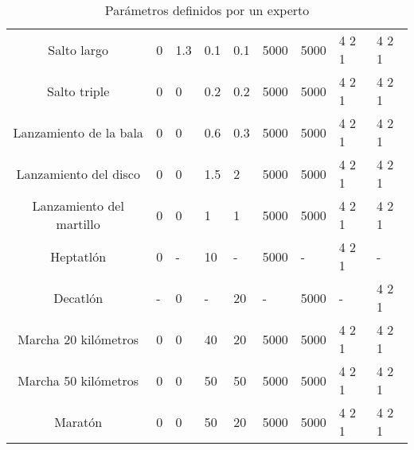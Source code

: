 \begin{anexos}
\begin{table}[H]
{\begin{tabular}{|c|P{1.3cm}|P{1.2cm}|P{1.3cm}|P{1.2cm}|P{1.4cm}|P{1.2cm}|P{2cm}|P{1.5cm}|}
            Salto largo & 0 & 1.3 & 0.1 & 0.1 & 5000 & 5000 & 4 2 1 & 4 2 1 \\
            Salto triple & 0 & 0 & 0.2 & 0.2 & 5000 & 5000 & 4 2 1 & 4 2 1 \\
            Lanzamiento de la bala & 0 & 0 & 0.6 & 0.3 & 5000 & 5000 & 4 2 1 & 4 2 1 \\
            Lanzamiento del disco & 0 & 0 & 1.5 & 2 & 5000 & 5000 & 4 2 1 & 4 2 1 \\
            Lanzamiento del martillo & 0 & 0 & 1 & 1 & 5000 & 5000 & 4 2 1 & 4 2 1 \\
            Heptatlón & 0 & - & 10 & - & 5000 & - & 4 2 1 & - \\
            Decatlón & - & 0 & - & 20 & - & 5000 & - & 4 2 1 \\
            Marcha 20 kilómetros & 0 & 0 & 40 & 20 & 5000 & 5000 & 4 2 1 & 4 2 1 \\
            Marcha 50 kilómetros & 0 & 0 & 50 & 50 & 5000 & 5000 & 4 2 1 & 4 2 1 \\
            Maratón & 0 & 0 & 50 & 20 & 5000 & 5000 & 4 2 1 & 4 2 1 \\
            \hline
        \end{tabular}
        \caption{Parámetros definidos por un experto}
        \label{tab:paramsmanual}
    }
\end{table}


\end{anexos}
